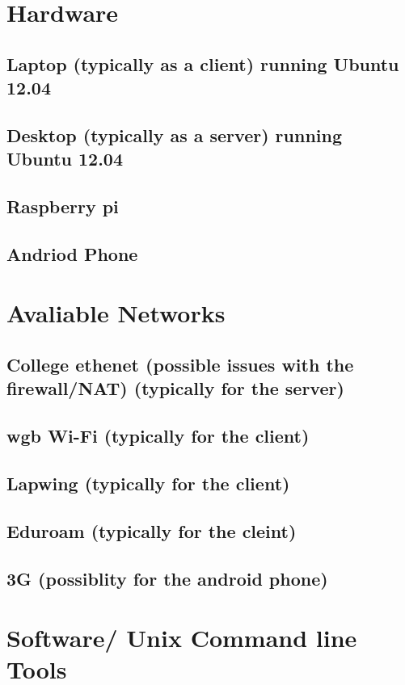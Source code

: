\documentclass[12pt,a4paper,oneside]{article}
\begin{document}
\section{Hardware} 

\subsection{Laptop (typically as a client) running Ubuntu 12.04}
\subsection{Desktop (typically as a server) running Ubuntu 12.04}
\subsection{Raspberry pi}
\subsection{Andriod Phone} 

\section{Avaliable Networks}

\subsection{College ethenet (possible issues with the firewall/NAT) (typically for the server)}
\subsection{wgb Wi-Fi (typically for the client)}
\subsection{Lapwing (typically for the client)}
\subsection{Eduroam (typically for the cleint)}
\subsection{3G (possiblity for the android phone)}

\section{Software/ Unix Command line Tools}
\end{document}
